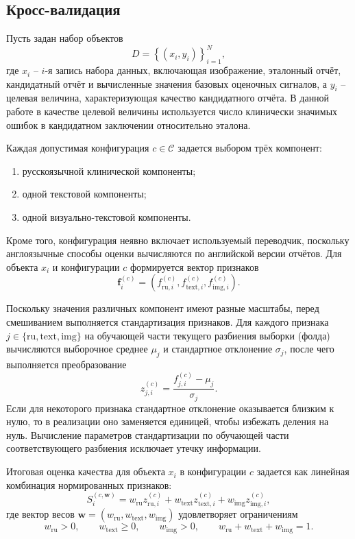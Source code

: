 \subsection{Кросс-валидация}

Пусть задан набор объектов
\[
D = \left\{(x_i, y_i)\right\}_{i=1}^{N},
\]
где $x_i$ -- $i$-я запись набора данных, включающая изображение, эталонный отчёт, кандидатный отчёт и вычисленные значения базовых оценочных сигналов, а $y_i$ -- целевая величина, характеризующая качество кандидатного отчёта. В данной работе в качестве целевой величины используется число клинически значимых ошибок в кандидатном заключении относительно эталона.

Каждая допустимая конфигурация $c \in \mathcal{C}$ задается выбором трёх компонент:
\begin{enumerate}
    \item русскоязычной клинической компоненты;
    \item одной текстовой компоненты;
    \item одной визуально-текстовой компоненты.
\end{enumerate}
Кроме того, конфигурация неявно включает используемый переводчик, поскольку англоязычные способы оценки вычисляются по английской версии отчётов. Для объекта $x_i$ и конфигурации $c$ формируется вектор признаков
\[
\mathbf{f}_i^{(c)} =
\left(
f^{(c)}_{\mathrm{ru},i},
f^{(c)}_{\mathrm{text},i},
f^{(c)}_{\mathrm{img},i}
\right).
\]

Поскольку значения различных компонент имеют разные масштабы, перед смешиванием выполняется стандартизация признаков. Для каждого признака $j \in \{\mathrm{ru}, \mathrm{text}, \mathrm{img}\}$ на обучающей части текущего разбиения выборки (фолда) вычисляются выборочное среднее $\mu_j$ и стандартное отклонение $\sigma_j$, после чего выполняется преобразование
\[
z^{(c)}_{j,i} = \frac{f^{(c)}_{j,i} - \mu_j}{\sigma_j}.
\]
Если для некоторого признака стандартное отклонение оказывается близким к нулю, то в реализации оно заменяется единицей, чтобы избежать деления на нуль. Вычисление параметров стандартизации по обучающей части соответствующего разбиения исключает утечку информации.

Итоговая оценка качества для объекта $x_i$ в конфигурации $c$ задается как линейная комбинация нормированных признаков:
\[
S_i^{(c,\mathbf{w})}
=
w_{\mathrm{ru}} z^{(c)}_{\mathrm{ru},i}
+
w_{\mathrm{text}} z^{(c)}_{\mathrm{text},i}
+
w_{\mathrm{img}} z^{(c)}_{\mathrm{img},i},
\]
где вектор весов $\mathbf{w} = \left(w_{\mathrm{ru}}, w_{\mathrm{text}}, w_{\mathrm{img}}\right)$ удовлетворяет ограничениям
\[
w_{\mathrm{ru}} > 0,\qquad
w_{\mathrm{text}} \ge 0,\qquad
w_{\mathrm{img}} > 0,\qquad
w_{\mathrm{ru}} + w_{\mathrm{text}} + w_{\mathrm{img}} = 1.
\]

